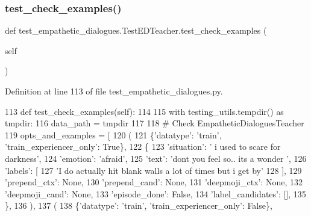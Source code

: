 \subsubsection{\texorpdfstring{test\+\_\+check\+\_\+examples()}{test\_check\_examples()}}
{\footnotesize\ttfamily def test\+\_\+empathetic\+\_\+dialogues.\+Test\+E\+D\+Teacher.\+test\+\_\+check\+\_\+examples (\begin{DoxyParamCaption}\item[{}]{self }\end{DoxyParamCaption})}



Definition at line 113 of file test\+\_\+empathetic\+\_\+dialogues.\+py.


\begin{DoxyCode}
113     \textcolor{keyword}{def }test\_check\_examples(self):
114 
115         with testing\_utils.tempdir() \textcolor{keyword}{as} tmpdir:
116             data\_path = tmpdir
117 
118             \textcolor{comment}{# Check EmpatheticDialoguesTeacher}
119             opts\_and\_examples = [
120                 (
121                     \{\textcolor{stringliteral}{'datatype'}: \textcolor{stringliteral}{'train'}, \textcolor{stringliteral}{'train\_experiencer\_only'}: \textcolor{keyword}{True}\},
122                     \{
123                         \textcolor{stringliteral}{'situation'}: \textcolor{stringliteral}{' i used to scare for darkness'},
124                         \textcolor{stringliteral}{'emotion'}: \textcolor{stringliteral}{'afraid'},
125                         \textcolor{stringliteral}{'text'}: \textcolor{stringliteral}{'dont you feel so.. its a wonder '},
126                         \textcolor{stringliteral}{'labels'}: [
127                             \textcolor{stringliteral}{'I do actually hit blank walls a lot of times but i get by'}
128                         ],
129                         \textcolor{stringliteral}{'prepend\_ctx'}: \textcolor{keywordtype}{None},
130                         \textcolor{stringliteral}{'prepend\_cand'}: \textcolor{keywordtype}{None},
131                         \textcolor{stringliteral}{'deepmoji\_ctx'}: \textcolor{keywordtype}{None},
132                         \textcolor{stringliteral}{'deepmoji\_cand'}: \textcolor{keywordtype}{None},
133                         \textcolor{stringliteral}{'episode\_done'}: \textcolor{keyword}{False},
134                         \textcolor{stringliteral}{'label\_candidates'}: [],
135                     \},
136                 ),
137                 (
138                     \{\textcolor{stringliteral}{'datatype'}: \textcolor{stringliteral}{'train'}, \textcolor{stringliteral}{'train\_experiencer\_only'}: \textcolor{keyword}{False}\},

\end{DoxyCode}
